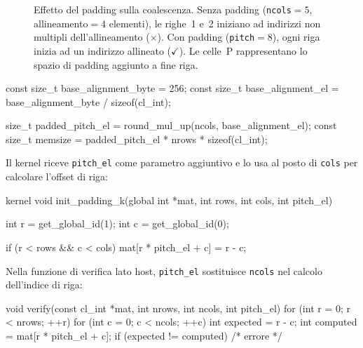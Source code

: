 \begin{figure}[htbp]
\caption{Effetto del padding sulla coalescenza. Senza padding (\texttt{ncols}$=5$, allineamento$=4$ elementi), le righe~1 e~2 iniziano ad indirizzi non multipli dell'allineamento ($\times$). Con padding (\texttt{pitch}$=8$), ogni riga inizia ad un indirizzo allineato ($\checkmark$). Le celle~P rappresentano lo spazio di padding aggiunto a fine riga.}
\label{fig:padding_matrix}
\end{figure}

\begin{code}[caption={Calcolo del pitch lato host}, label={code:matinit_pitch}]
const size_t base_alignment_byte = 256;
const size_t base_alignment_el   = base_alignment_byte / sizeof(cl_int);

size_t padded_pitch_el = round_mul_up(ncols, base_alignment_el);
const size_t memsize   = padded_pitch_el * nrows * sizeof(cl_int);
\end{code}

Il kernel riceve \texttt{pitch\_el} come parametro aggiuntivo e lo usa al posto di \texttt{cols} per calcolare l'offset di riga:

\begin{code}[caption={Kernel con padding (pitch)}, label={code:matinit_kernel_padding}]
kernel void init_padding_k(global int *mat, int rows, int cols, int pitch_el)
{
    int r = get_global_id(1);
    int c = get_global_id(0);

    if (r < rows && c < cols) mat[r * pitch_el + c] = r - c;
}
\end{code}

Nella funzione di verifica lato host, \texttt{pitch\_el} sostituisce \texttt{ncols} nel calcolo dell'indice di riga:

\begin{code}[caption={Verifica con pitch}, label={code:matinit_verify_padding}]
void verify(const cl_int *mat, int nrows, int ncols, int pitch_el) {
    for (int r = 0; r < nrows; ++r)
        for (int c = 0; c < ncols; ++c) {
            int expected = r - c;
            int computed = mat[r * pitch_el + c];
            if (expected != computed) { /* errore */ }
        }
}
\end{code}

